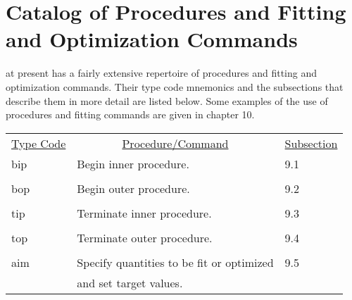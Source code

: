 
\chapter[Catalog of Procedures and Fitting and $\cdots$]{Catalog of Procedures and Fitting and Optimization Commands}
      at present has a fairly extensive repertoire of procedures
and fitting and optimization commands.  Their type code mnemonics and the
subsections that describe them in more detail are listed below.  Some
examples of the use of procedures and fitting commands are given in chapter
10.   

\begin{center}
\begin{tabular}{lll}
\multicolumn{1}{c}{\underline {Type Code}} &
\multicolumn{1}{c}{\underline{Procedure/Command}}   &
\multicolumn{1}{c}{\underline{Subsection}} \\
\hspace{1.5em}bip    &     Begin inner procedure.          &       \hspace{2em}9.1\\
\vspace{-3mm}& &\\
\hspace{1.5em}bop    &     Begin outer procedure.          &       \hspace{2em}9.2\\
\vspace{-3mm}& &\\
\hspace{1.5em}tip    &     Terminate inner procedure.      &       \hspace{2em}9.3\\
\vspace{-3mm}& &\\
\hspace{1.5em}top    &     Terminate outer procedure.       &     \hspace{2em}9.4\\
\vspace{-3mm}& &\\
\hspace{1.5em}aim    &     Specify quantities to be fit or optimized  &  \hspace{2em}9.5\\
           &   and set target values. &\\

\end{tabular}
\end{center}
